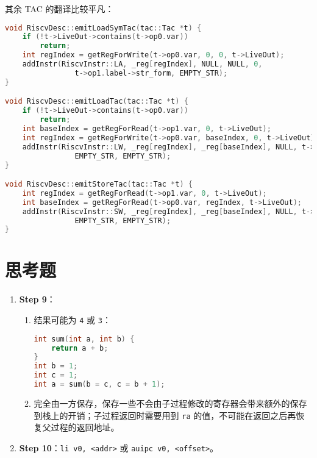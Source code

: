 \documentclass[a4paper]{article}
\begin{document}
其余 TAC 的翻译比较平凡：

\begin{lstlisting}[language=c++]
void RiscvDesc::emitLoadSymTac(tac::Tac *t) {
    if (!t->LiveOut->contains(t->op0.var))
        return;
    int regIndex = getRegForWrite(t->op0.var, 0, 0, t->LiveOut);
    addInstr(RiscvInstr::LA, _reg[regIndex], NULL, NULL, 0,
                t->op1.label->str_form, EMPTY_STR);
}

void RiscvDesc::emitLoadTac(tac::Tac *t) {
    if (!t->LiveOut->contains(t->op0.var))
        return;
    int baseIndex = getRegForRead(t->op1.var, 0, t->LiveOut);
    int regIndex = getRegForWrite(t->op0.var, baseIndex, 0, t->LiveOut);
    addInstr(RiscvInstr::LW, _reg[regIndex], _reg[baseIndex], NULL, t->op1.ival,
                EMPTY_STR, EMPTY_STR);
}

void RiscvDesc::emitStoreTac(tac::Tac *t) {
    int regIndex = getRegForRead(t->op1.var, 0, t->LiveOut);
    int baseIndex = getRegForRead(t->op0.var, regIndex, t->LiveOut);
    addInstr(RiscvInstr::SW, _reg[regIndex], _reg[baseIndex], NULL, t->op0.ival,
                EMPTY_STR, EMPTY_STR);
}
\end{lstlisting}

\section{思考题}

\begin{enumerate}
    \item \textbf{Step 9}：\begin{enumerate}
              \item 结果可能为 \texttt{4} 或 \texttt{3}：\begin{lstlisting}[language=c]
int sum(int a, int b) {
    return a + b;
}
int b = 1;
int c = 1;
int a = sum(b = c, c = b + 1);
            \end{lstlisting}
              \item 完全由一方保存，保存一些不会由子过程修改的寄存器会带来额外的保存到栈上的开销；子过程返回时需要用到 \texttt{ra} 的值，不可能在返回之后再恢复父过程的返回地址。
          \end{enumerate}
    \item \textbf{Step 10}：\texttt{li v0, <addr>} 或 \texttt{auipc v0, <offset>}。
\end{enumerate}
\end{document}
